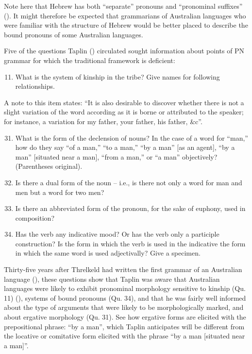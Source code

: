 Note here that Hebrew has both “separate” pronouns and “pronominal suffixes” (\citealt[105--109]{gesenius_gesenius_1910}). It might therefore be expected that grammarians of Australian languages who were familiar with the structure of Hebrew would be better placed to describe the bound pronouns of some Australian languages. 

Five of the questions Taplin (\citeyear[6]{taplin_1879a_nodate}) circulated sought information about points of PN grammar for which the traditional framework is deficient: 

\begin{enumerate}
    \setcounter{enumi}{10}
    \item What is the system of kinship in the tribe? Give names for following relationships.
\end{enumerate}

A note to this item states: “It is also desirable to discover whether there is not a slight variation of the word according as it is borne or attributed to the speaker; for instance, a variation for my father, your father, his father, \&c”. 

\begin{enumerate}
    \setcounter{enumi}{30}
    \item What is the form of the declension of nouns? In the case of a word for “man,” how do they say “of a man,” “to a man,” “by a man” [as an agent], “by a man” [situated near a man], “from a man,” or “a man” objectively? (Parentheses original).
    \item Is there a dual form of the noun – i.e., is there not only a word for man and men but a word for two men?
    \setcounter{enumi}{33}
    \item Is there an abbreviated form of the pronoun, for the sake of euphony, used in composition?
    \setcounter{enumi}{35}
    \item Has the verb any indicative mood? Or has the verb only a participle construction? Is the form in which the verb is used in the indicative the form in which the same word is used adjectivally? Give a specimen.
\end{enumerate}

Thirty-five years after Threlkeld had written the first grammar of an Australian language (\citeyear{threlkeld_australian_1834}), these questions show that Taplin was aware that Australian languages were likely to exhibit pronominal morphology sensitive to kinship (Qu. 11) (), systems of bound pronouns (Qu. 34), and that he was fairly well informed about the type of arguments that were likely to be morphologically marked, and about ergative morphology (Qu. 31). See how ergative forms are elicited with the prepositional phrase: “by a man'', which Taplin anticipates will be different from the locative or comitative form elicited with the phrase “by a man [situated near a man]''.

